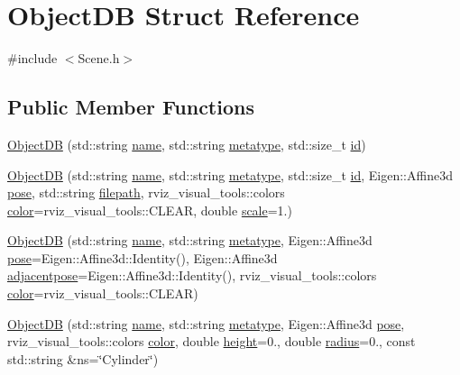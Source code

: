 \hypertarget{structObjectDB}{\section{Object\-D\-B Struct Reference}
\label{structObjectDB}
}


{\ttfamily \#include $<$Scene.\-h$>$}

\subsection*{Public Member Functions}
\begin{DoxyCompactItemize}
\item 
\hyperlink{structObjectDB_ae145fb7a66b48f862cc6cbc4d01ae9a6}{Object\-D\-B} (std\-::string \hyperlink{structObjectDB_aac9d3fa047f7df1d8981fd3c6e97dd25}{name}, std\-::string \hyperlink{structObjectDB_a0f12d7a7c86ff08dfd2ee1efc93d2c89}{metatype}, std\-::size\-\_\-t \hyperlink{structObjectDB_aab8a4b39fdbd287df00a9b38d1cae926}{id})
\item 
\hyperlink{structObjectDB_afadfd1e507d2b3998d527ccd6f0f24e4}{Object\-D\-B} (std\-::string \hyperlink{structObjectDB_aac9d3fa047f7df1d8981fd3c6e97dd25}{name}, std\-::string \hyperlink{structObjectDB_a0f12d7a7c86ff08dfd2ee1efc93d2c89}{metatype}, std\-::size\-\_\-t \hyperlink{structObjectDB_aab8a4b39fdbd287df00a9b38d1cae926}{id}, Eigen\-::\-Affine3d \hyperlink{structObjectDB_a8026e6c724f6193ab457c5f0ad924551}{pose}, std\-::string \hyperlink{structObjectDB_a2e171343bb62d57745e9bbb02c8a6bf7}{filepath}, rviz\-\_\-visual\-\_\-tools\-::colors \hyperlink{structObjectDB_a836db3f6e7558a6d9e634b6ea0f0f587}{color}=rviz\-\_\-visual\-\_\-tools\-::\-C\-L\-E\-A\-R, double \hyperlink{structObjectDB_a8275f4314ddaba5cf47d65fac944ea96}{scale}=1.)
\item 
\hyperlink{structObjectDB_ad4df607c899e78310311452a541d0a99}{Object\-D\-B} (std\-::string \hyperlink{structObjectDB_aac9d3fa047f7df1d8981fd3c6e97dd25}{name}, std\-::string \hyperlink{structObjectDB_a0f12d7a7c86ff08dfd2ee1efc93d2c89}{metatype}, Eigen\-::\-Affine3d \hyperlink{structObjectDB_a8026e6c724f6193ab457c5f0ad924551}{pose}=Eigen\-::\-Affine3d\-::\-Identity(), Eigen\-::\-Affine3d \hyperlink{structObjectDB_ae11c0410cb15ffe04a5179e59c48c078}{adjacentpose}=Eigen\-::\-Affine3d\-::\-Identity(), rviz\-\_\-visual\-\_\-tools\-::colors \hyperlink{structObjectDB_a836db3f6e7558a6d9e634b6ea0f0f587}{color}=rviz\-\_\-visual\-\_\-tools\-::\-C\-L\-E\-A\-R)
\item 
\hyperlink{structObjectDB_a0c10410ce9a14185e1bacd78d0c6fa75}{Object\-D\-B} (std\-::string \hyperlink{structObjectDB_aac9d3fa047f7df1d8981fd3c6e97dd25}{name}, std\-::string \hyperlink{structObjectDB_a0f12d7a7c86ff08dfd2ee1efc93d2c89}{metatype}, Eigen\-::\-Affine3d \hyperlink{structObjectDB_a8026e6c724f6193ab457c5f0ad924551}{pose}, rviz\-\_\-visual\-\_\-tools\-::colors \hyperlink{structObjectDB_a836db3f6e7558a6d9e634b6ea0f0f587}{color}, double \hyperlink{structObjectDB_afa3f0a0fd7cc078010a6265c1061b3d2}{height}=0., double \hyperlink{structObjectDB_acd411795d2b56563c2fcfca77d25fc0c}{radius}=0., const std\-::string \&ns=\char`\"{}Cylinder\char`\"{})
\end{DoxyCompactItemize}
